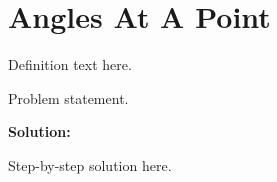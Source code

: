 \section{Angles At A Point}


\begin{definition}[Term]
Definition text here.
\end{definition}

\begin{example}
Problem statement.

\textbf{Solution:}

Step-by-step solution here.
\end{example}
